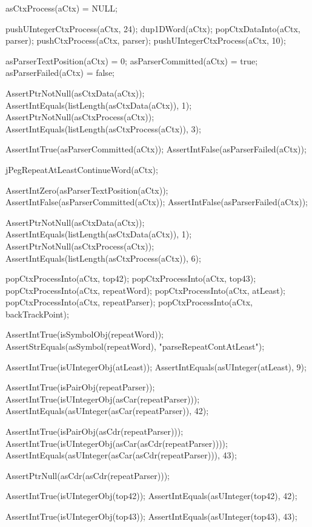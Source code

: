 \startCTest
  asCtxProcess(aCtx) = NULL;
  
  pushUIntegerCtxProcess(aCtx, 24);
  dup1DWord(aCtx);
  popCtxDataInto(aCtx, parser);
  pushCtxProcess(aCtx, parser);
  pushUIntegerCtxProcess(aCtx, 10);
  
  asParserTextPosition(aCtx) = 0;
  asParserCommitted(aCtx)    = true;
  asParserFailed(aCtx)       = false;
  
  AssertPtrNotNull(asCtxData(aCtx));
  AssertIntEquals(listLength(asCtxData(aCtx)), 1);
  AssertPtrNotNull(asCtxProcess(aCtx));
  AssertIntEquals(listLength(asCtxProcess(aCtx)), 3);
  
  AssertIntTrue(asParserCommitted(aCtx));
  AssertIntFalse(asParserFailed(aCtx));
  
  jPegRepeatAtLeastContinueWord(aCtx);
  
  AssertIntZero(asParserTextPosition(aCtx));
  AssertIntFalse(asParserCommitted(aCtx));
  AssertIntFalse(asParserFailed(aCtx));
  
  AssertPtrNotNull(asCtxData(aCtx));
  AssertIntEquals(listLength(asCtxData(aCtx)), 1);
  AssertPtrNotNull(asCtxProcess(aCtx));
  AssertIntEquals(listLength(asCtxProcess(aCtx)), 6);
  
  popCtxProcessInto(aCtx, top42);
  popCtxProcessInto(aCtx, top43);
  popCtxProcessInto(aCtx, repeatWord);
  popCtxProcessInto(aCtx, atLeast);
  popCtxProcessInto(aCtx, repeatParser);
  popCtxProcessInto(aCtx, backTrackPoint);
  
  AssertIntTrue(isSymbolObj(repeatWord));
  AssertStrEquals(asSymbol(repeatWord), "parseRepeatContAtLeast");
  
  AssertIntTrue(isUIntegerObj(atLeast));
  AssertIntEquals(asUInteger(atLeast), 9);
  
  AssertIntTrue(isPairObj(repeatParser));
  AssertIntTrue(isUIntegerObj(asCar(repeatParser)));
  AssertIntEquals(asUInteger(asCar(repeatParser)), 42);
  
  AssertIntTrue(isPairObj(asCdr(repeatParser)));
  AssertIntTrue(isUIntegerObj(asCar(asCdr(repeatParser))));
  AssertIntEquals(asUInteger(asCar(asCdr(repeatParser))), 43);
  
  AssertPtrNull(asCdr(asCdr(repeatParser)));
  
  AssertIntTrue(isUIntegerObj(top42));
  AssertIntEquals(asUInteger(top42), 42);  

  AssertIntTrue(isUIntegerObj(top43));
  AssertIntEquals(asUInteger(top43), 43);
  
